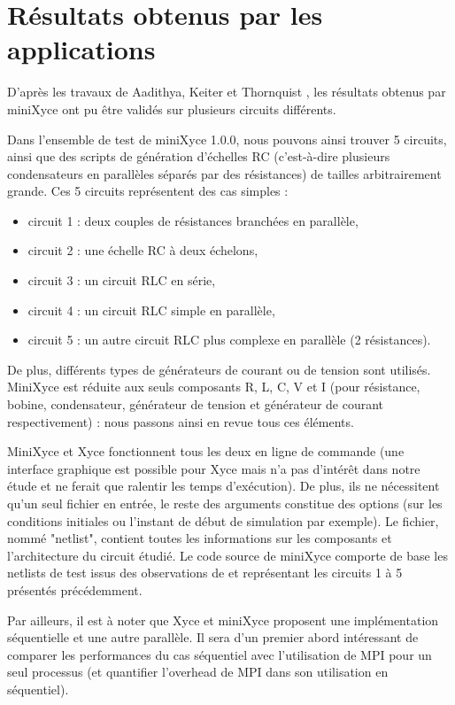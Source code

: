 \documentclass[11pt,a4paper,oneside]{memoir}
\theoremstyle{definition}
\theoremstyle{remark}
\theoremstyle{plain}
\begin{document}
\section{Résultats obtenus par les applications}

D'après les travaux de Aadithya, Keiter et Thornquist \cite{minixyce-validation}, les résultats obtenus par miniXyce ont pu être validés sur plusieurs circuits différents.

Dans l'ensemble de test de miniXyce 1.0.0, nous pouvons ainsi trouver 5 circuits, ainsi que des scripts de génération d'échelles RC (c'est-à-dire plusieurs condensateurs en parallèles séparés par des résistances) de tailles arbitrairement grande.
Ces 5 circuits représentent des cas simples :
\begin{itemize}
\item circuit 1 : deux couples de résistances branchées en parallèle,
\item circuit 2 : une échelle RC à deux échelons,
\item circuit 3 : un circuit RLC en série,
\item circuit 4 : un circuit RLC simple en parallèle,
\item circuit 5 : un autre circuit RLC plus complexe en parallèle (2 résistances).
\end{itemize}
De plus, différents types de générateurs de courant ou de tension sont utilisés. MiniXyce est réduite aux seuls composants R, L, C, V et I (pour résistance, bobine, condensateur, générateur de tension et générateur de courant respectivement) : nous passons ainsi en revue tous ces éléments.\bigskip

MiniXyce et Xyce fonctionnent tous les deux en ligne de commande (une interface graphique est possible pour Xyce mais n'a pas d'intérêt dans notre étude et ne ferait que ralentir les temps d'exécution). De plus, ils ne nécessitent qu'un seul fichier en entrée, le reste des arguments constitue des options (sur les conditions initiales ou l'instant de début de simulation par exemple). Le fichier, nommé "netlist", contient toutes les informations sur les composants et l'architecture du circuit étudié. Le code source de miniXyce comporte de base les netlists de test issus des observations de \cite{minixyce-validation} et représentant les circuits 1 à 5 présentés précédemment.

Par ailleurs, il est à noter que Xyce et miniXyce proposent une implémentation séquentielle et une autre parallèle. Il sera d'un premier abord intéressant de comparer les performances du cas séquentiel avec l'utilisation de MPI pour un seul processus (et quantifier l'overhead de MPI dans son utilisation en séquentiel).\bigskip
\end{document}
